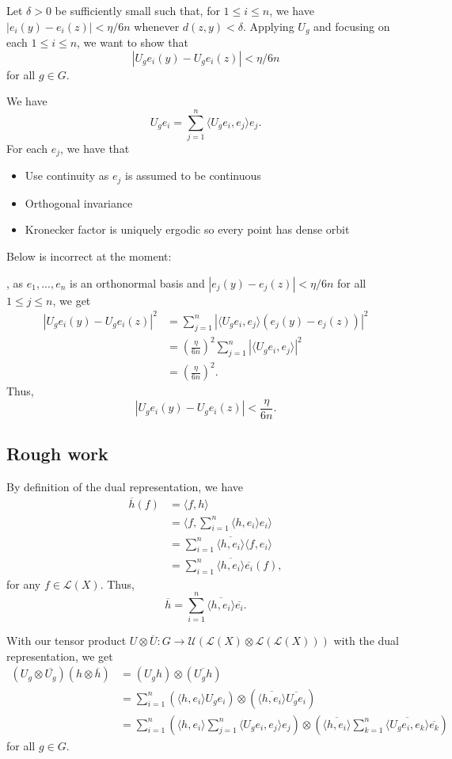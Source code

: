 \documentclass[
  british,
]{article}
\providecommand{\tightlist}{%
  \setlength{\itemsep}{0pt}\setlength{\parskip}{0pt}}
\theoremstyle{plain}
\theoremstyle{plain}
\theoremstyle{plain}
\theoremstyle{definition}
\theoremstyle{remark}
\begin{document}
Let \(\delta>0\) be sufficiently small such that, for \(1\leq i\leq n\),
we have \(|e_i(y)-e_i(z)|<\eta/6n\) whenever \(d(z,y)<\delta\). Applying
\(U_g\) and focusing on each \(1\leq i\leq n\), we want to show that \[
|U_ge_i(y)-U_ge_i(z)|<\eta/6n
\] for all \(g\in G\).

We have \[
U_ge_i=\sum_{j=1}^n \langle U_ge_i,e_j\rangle e_j.
\] For each \(e_j\), we have that

\begin{itemize}
\tightlist
\item
  Use continuity as \(e_j\) is assumed to be continuous
\item
  Orthogonal invariance
\item
  Kronecker factor is uniquely ergodic so every point has dense orbit
\end{itemize}

Below is incorrect at the moment:

, as \(e_1,...,e_n\) is an orthonormal basis and
\(|e_j(y)-e_j(z)|<\eta/6n\) for all \(1\leq j\leq n\), we get
\begin{align*}
|U_ge_i(y)-U_ge_i(z)|^2&= \sum_{j=1}^n |\langle U_ge_i,e_j\rangle (e_j(y)-e_j(z))|^2
\\&=\left(\frac{\eta}{6n}\right)^2\sum_{j=1}^n |\langle U_ge_i,e_j\rangle|^2
\\&=\left(\frac{\eta}{6n}\right)^2.
\end{align*} Thus, \[
|U_ge_i(y)-U_ge_i(z)|<\frac{\eta}{6n}.
\]

\subsection{Rough work}\label{rough-work}

By definition of the dual representation, we have \begin{align*}
\overline{h}(f)&=\langle f,h\rangle
\\&=\langle f,\sum_{i=1}^n \langle h,e_i \rangle e_i\rangle
\\&=\sum_{i=1}^n \overline{\langle h,e_i \rangle} \langle f,e_i\rangle
\\&=\sum_{i=1}^n \overline{\langle h,e_i \rangle} \overline{e_i}(f),
\end{align*} for any \(f\in\mathcal{L}(X)\). Thus, \[
\overline{h}=\sum_{i=1}^n \overline{\langle h,e_i \rangle}\overline{e_i}.
\]

With our tensor product
\(U\otimes\overline{U}:G\rightarrow\mathscr{U}(\mathcal{L}(X)\otimes\mathcal{L}(\mathcal{L}(X)))\)
with the dual representation, we get \begin{align*}
(U_g\otimes\overline{U_g})(h\otimes\overline{h})&=(U_gh)\otimes(\overline{U_gh})
\\&=\sum_{i=1}^n\left( \langle h,e_i \rangle U_ge_i\right)\otimes\left(\overline{\langle h,e_i \rangle}\overline{U_ge_i}\right)
\\&=\sum_{i=1}^n\left(\langle h,e_i \rangle \sum_{j=1}^n \langle U_ge_i,e_j\rangle e_j\right)\otimes\left(\overline{\langle h,e_i \rangle}\sum_{k=1}^n\overline{\langle U_ge_i,e_k\rangle}\overline{e_k}\right)
\end{align*} for all \(g\in G\).
\end{document}
